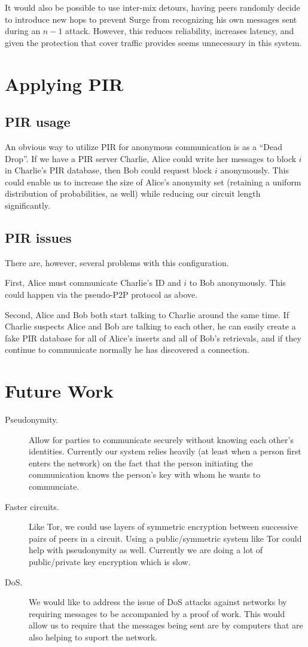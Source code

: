 \documentclass[twocolumn,11pt,english]{article}
\begin{document}
It would also be possible to use inter-mix detours\cite{TODO}, having peers randomly decide to introduce new hops to prevent Surge from recognizing his own messages sent during an $n - 1$ attack. However, this reduces reliability, increases latency, and given the protection that cover traffic provides seems unnecessary in this system. 

\section{Applying PIR}
\subsection{PIR usage}
An obvious way to utilize PIR for anonymous communication is as a ``Dead Drop''. If we have a PIR server Charlie, Alice could write her messages to block $i$ in Charlie's PIR database, then Bob could request block $i$ anonymously. This could enable us to increase the size of Alice's anonymity set (retaining a uniform distribution of probabilities, as well) while reducing our circuit length significantly. 

\subsection{PIR issues}
There are, however, several problems with this configuration.

First, Alice must communicate Charlie's ID and $i$ to Bob anonymously. This could happen via the pseudo-P2P protocol as above. 

Second, Alice and Bob both start talking to Charlie around the same time. If Charlie suspects Alice and Bob are talking to each other, he can easily create a fake PIR database for all of Alice's inserts and all of Bob's retrievals, and if they continue to communicate normally he has discovered a connection. 


\section{Future Work}
\begin{description}
\item[Pseudonymity.] Allow for parties to communicate securely without knowing each other's identities. Currently our system relies heavily (at least when a person first enters the network) on the fact that the person initiating the communication knows the person's key with whom he wants to communciate.

\item[Faster circuits.] Like Tor, we could use layers of symmetric encryption between successive pairs of peers in a circuit. Using a public/symmetric system like Tor could help with pseudonymity as well. Currently we are doing a lot of public/private key encryption which is slow.

\item[DoS.] We would like to address the issue of DoS attacks against networks by requiring messages to be accompanied by a proof of work. This would allow us to require that the messages being sent are by computers that are also helping to suport the network.
\end{description}
\end{document}
